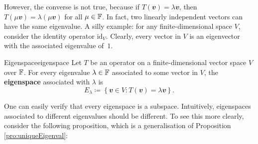 \documentclass[math, code]{amznotes}
\theoremstyle{remark}
\begin{document}
However, the converse is not true, because if $T(\mathbfit{v}) = \lambda\mathbfit{v}$, then $T(\mu\mathbfit{v}) = \lambda(\mu\mathbfit{v})$ for all $\mu \in \mathbb{F}$. In fact, two linearly independent vectors can have the same eigenvalue. A silly example: for any finite-dimensional space $V$, consider the identity operator $\mathrm{id}_V$. Clearly, every vector in $V$ is an eigenvector with the associated eigenvalue of~$1$.
\begin{dfnbox}{Eigenspace}{eigenspace}
    Let $T$ be an operator on a finite-dimensional vector space $V$ over $\mathbb{F}$. For every eigenvalue $\lambda \in \mathbb{F}$ associated to some vector in $V$, the {\color{red} \textbf{eigenspace}} associated with $\lambda$ is 
    \begin{equation*}
        E_\lambda \coloneqq \left\{\mathbfit{v} \in V \colon T(\mathbfit{v}) = \lambda\mathbfit{v}\right\}.
    \end{equation*}
\end{dfnbox}
One can easily verify that every eigenspace is a subspace. Intuitively, eigenspaces associated to different eigenvalues should be different. To see this more clearly, consider the following proposition, which is a generalisation of Proposition \ref{pro:uniqueEigenval}:
\end{document}
